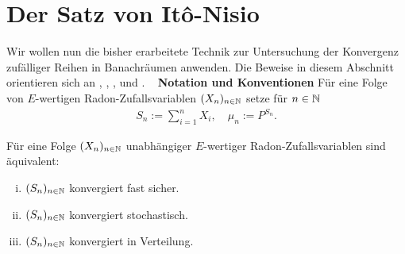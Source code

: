 \section{Der Satz von Itô-Nisio}
    Wir wollen nun die bisher erarbeitete Technik zur Untersuchung der Konvergenz zufälliger Reihen in Banachräumen anwenden. 
    Die Beweise in diesem Abschnitt orientieren sich an \cite{ito-nisio}, \cite{ledoux-talagrand}, \cite{li-queffelec}, \cite{van-neerven} und \cite{heyer}.  
    \newline \ \newline 
    \textbf{Notation und Konventionen}\newline
    Für eine Folge von $E$-wertigen Radon-Zufallsvariablen $(X_n)_{n \in \mathbb{N}}$ setze für $n \in \mathbb{N}$
    \begin{align*}
    S_n := \sum_{i=1}^n X_i, 
    \quad 
    \mu_n := P^{S_n} .
    \end{align*}
\begin{theorem}
    Für eine Folge $(X_n)_{n \in \mathbb{N}}$ unabhängiger $E$-wertiger Radon-Zufallsvariablen sind äquivalent:
    \begin{enumerate}[(i)]
        \item $(S_n)_{n \in \mathbb{N}}$ konvergiert fast sicher.
        \item $(S_n)_{n \in \mathbb{N}}$ konvergiert stochastisch.
        \item $(S_n)_{n \in \mathbb{N}}$ konvergiert in Verteilung. 
    \end{enumerate}
\end{theorem}

